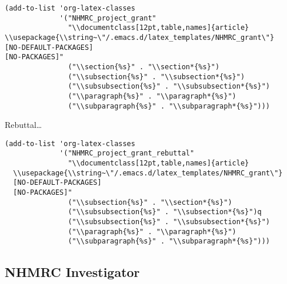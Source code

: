 \documentclass[12pt]{article}
\begin{document}
\begin{verbatim}
(add-to-list 'org-latex-classes
             '("NHMRC_project_grant"
               "\\documentclass[12pt,table,names]{article}
\\usepackage{\\string~\"/.emacs.d/latex_templates/NHMRC_grant\"}
[NO-DEFAULT-PACKAGES]
[NO-PACKAGES]"
               ("\\section{%s}" . "\\section*{%s}")
               ("\\subsection{%s}" . "\\subsection*{%s}")
               ("\\subsubsection{%s}" . "\\subsubsection*{%s}")
               ("\\paragraph{%s}" . "\\paragraph*{%s}")
               ("\\subparagraph{%s}" . "\\subparagraph*{%s}")))
\end{verbatim}
Rebuttal\ldots{} 
\begin{verbatim}
(add-to-list 'org-latex-classes
             '("NHMRC_project_grant_rebuttal"
               "\\documentclass[12pt,table,names]{article}
  \\usepackage{\\string~\"/.emacs.d/latex_templates/NHMRC_grant\"}
  [NO-DEFAULT-PACKAGES]
  [NO-PACKAGES]"
               ("\\subsection{%s}" . "\\section*{%s}")
               ("\\subsubsection{%s}" . "\\subsection*{%s}")q
               ("\\subsubsection{%s}" . "\\subsubsection*{%s}")
               ("\\paragraph{%s}" . "\\paragraph*{%s}")
               ("\\subparagraph{%s}" . "\\subparagraph*{%s}")))

\end{verbatim}

\subsection{NHMRC Investigator}
\label{sec:org821b932}
\end{document}
